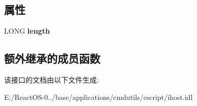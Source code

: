 \subsection*{属性}
\begin{DoxyCompactItemize}
\item 
\mbox{\label{interface_i_host_1_1_i_arguments2_ac38943d4e9c0b1fe778673ab82a4522f}} 
L\+O\+NG {\bfseries length}
\end{DoxyCompactItemize}
\subsection*{额外继承的成员函数}


该接口的文档由以下文件生成\+:\begin{DoxyCompactItemize}
\item 
E\+:/\+React\+O\+S-\/0../base/applications/cmdutils/cscript/ihost.\+idl\end{DoxyCompactItemize}
